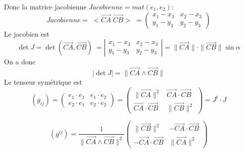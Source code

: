 \documentclass{beamer}
\begin{document}
\begin{frame}		
		
Donc la matrice jacobienne $Jacobienne=mat(e_1,e_2)$:
\[Jacobienne=\;<\overrightarrow{CA} \; \overrightarrow{CB}>\;=\left(\begin{array}{cc}
x_1-x_3 & x_2-x_3 \\
y_1-y_3 & y_2-y_3 
\end{array}\right)\]
Le jacobien est
\[\det J=\det(\overrightarrow{CA} , \overrightarrow{CB})\;=\left|\begin{array}{cc}
x_1-x_3 & x_2-x_3 \\
y_1-y_3 & y_2-y_3 
\end{array}\right| =\|\overrightarrow{CA}\|\cdot\|\overrightarrow{CB}\|\sin\alpha\]
On a donc 
\[|\det J|=\|\overrightarrow{CA}\wedge \overrightarrow{CB} \|\]
Le tenseur symétrique est
\[(g_{ij})=\left(\begin{array}{cc}
e_1\cdot e_1 & e_1\cdot e_2 \\
e_2\cdot e_1& e_2\cdot e_2
\end{array}\right) =\left(\begin{array}{cc}
\|\overrightarrow{CA}\|^2   &\overrightarrow{CA}\cdot \overrightarrow{CB} \\
\overrightarrow{CA}\cdot \overrightarrow{CB} & \|\overrightarrow{CB}\|^2
\end{array}\right)=J^t\cdot J\]

\[(g^{ij})=\frac{1}{\|\overrightarrow{CA}\wedge \overrightarrow{CB} \|^2}\left(\begin{array}{cc}
\|\overrightarrow{CB}\|^2   &-\overrightarrow{CA}\cdot \overrightarrow{CB} \\
-\overrightarrow{CA}\cdot \overrightarrow{CB} & \|\overrightarrow{CA}\|^2
\end{array}\right)\]

\end{frame}
\end{document}

